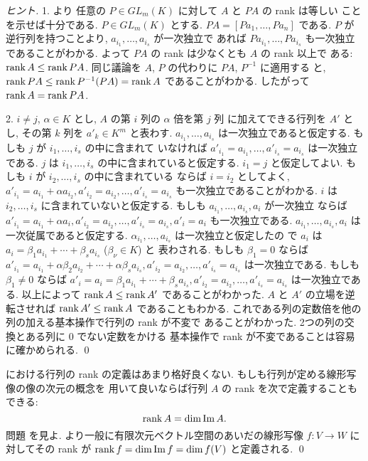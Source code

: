 \documentclass[12pt,twoside]{jarticle}
\begin{document}
\begin{proof}[ヒント]
  1. より
  任意の $P\in GL_m(K)$ に対して $A$ と $PA$ の rank は等しい
  ことを示せば十分である.  $P\in GL_m(K)$ とする.
  $PA=[Pa_1,\ldots,Pa_n]$ である. $P$ が逆行列を持つことより, 
  $a_{i_1},\ldots,a_{i_s}$ が一次独立で
  あれば $Pa_{i_1},\ldots,Pa_{i_s}$ も一次独立であることがわかる.
  よって $PA$ の rank は少なくとも $A$ の rank 以上で
  ある: $\mathop{\mathrm{rank}}\nolimits A \le\mathop{\mathrm{rank}}\nolimits PA$.
  同じ議論を $A$, $P$ の代わりに $PA$, $P^{-1}$ に適用する
  と, $\mathop{\mathrm{rank}}\nolimits PA \le\mathop{\mathrm{rank}}\nolimits P^{-1}(PA)=\mathop{\mathrm{rank}}\nolimits A$ であることがわかる.
  したがって $\mathop{\mathrm{rank}}\nolimits A = \mathop{\mathrm{rank}}\nolimits PA$.

  2. $i\ne j$, $\alpha\in K$ とし, $A$ の第 $i$ 列の $\alpha$ 倍を第 $j$ 列
  に加えてできる行列を $A'$ とし, その第 $k$ 列を $a'_k\in K^m$ と表わす.
  $a_{i_1},\ldots,a_{i_s}$ は一次独立であると仮定する.
  もしも $j$ が $i_1,\ldots,i_s$ の中に含まれて
  いなければ $a'_{i_1}=a_{i_1},\ldots,a'_{i_s}=a_{i_s}$ は一次独立である.
  $j$ は $i_1,\ldots,i_s$ の中に含まれていると仮定する. 
  $i_1=j$ と仮定してよい.
  もしも $i$ が $i_2,\ldots,i_s$ の中に含まれている
  ならば $i=i_2$ としてよく, $a'_{i_1}=a_{i_1}+\alpha a_{i_2}, 
  a'_{i_2}=a_{i_2},\ldots,a'_{i_s}=a_{i_s}$ も一次独立であることがわかる.
  $i$ は $i_2,\ldots,i_s$ に含まれていないと仮定する.
  もしも $a_{i_1},\ldots,a_{i_s},a_i$ が一次独立
  ならば $a'_{i_1}=a_{i_1}+\alpha a_i, 
  a'_{i_2}=a_{i_2},\ldots,a'_{i_s}=a_{i_s}, a'_i=a_i$ も一次独立である.
  $a_{i_1},\ldots,a_{i_s},a_i$ は一次従属であると仮定する.
  $\alpha_{i_1},\ldots,a_{i_s}$ は一次独立と仮定したの
  で $a_i$ は $a_i=\beta_1a_{i_1}+\cdots+\beta_sa_{i_s}$ ($\beta_\nu\in K$) と
  表わされる. もしも $\beta_1=0$ 
  ならば $a'_{i_1}=a_{i_1}+\alpha\beta_2a_{i_2}+\cdots+\alpha\beta_sa_{i_s},
  a'_{i_2}=a_{i_2},\ldots,a'_{i_s}=a_{i_s}$ は一次独立である.
  もしも $\beta_1\ne 0$ ならば $a'_i=a_i=\beta_1a_{i_1}+\cdots+\beta_sa_{i_s},
  a'_{i_2}=a_{i_2},\ldots,a'_{i_s}=a_{i_s}$ は一次独立である.
  以上によって $\mathop{\mathrm{rank}}\nolimits A\le \mathop{\mathrm{rank}}\nolimits A'$ であることがわかった.
  $A$ と $A'$ の立場を逆転させれば $\mathop{\mathrm{rank}}\nolimits A'\le\mathop{\mathrm{rank}}\nolimits A$ であることもわかる.
  これである列の定数倍を他の列の加える基本操作で行列の rank が不変で
  あることがわかった. 2つの列の交換とある列に $0$ でない定数をかける
  基本操作で rank が不変であることは容易に確かめられる.
  \qed
\end{proof}

\begin{guide}
  における行列の rank の定義はあまり格好良くない.
  もしも行列が定める線形写像の像の次元の概念を
  用いて良いならば行列 $A$ の rank を次で定義することもできる:
  \begin{equation*}
    \mathop{\mathrm{rank}}\nolimits A = \dim\mathop{\mathrm{Im}}\nolimits A.
  \end{equation*}
  問題  を見よ.
  より一般に有限次元ベクトル空間のあいだの線形写像 $f:V\to W$ に
  対してその rank が $\mathop{\mathrm{rank}}\nolimits f = \dim\mathop{\mathrm{Im}}\nolimits f = \dim f(V)$ と定義される.
  \qed
\end{guide}
\end{document}
